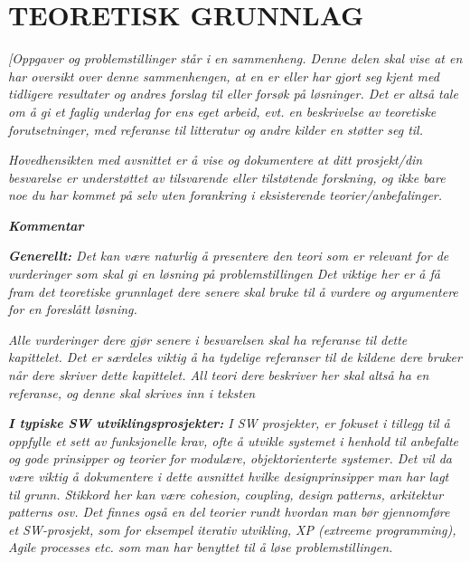 \documentclass[../main.tex]{subfiles}
\begin{document}
\section{TEORETISK GRUNNLAG}

\bigskip

{\itshape\color{blue}
[Oppgaver og problemstillinger st{\aa}r i en sammenheng. Denne delen skal vise at en har oversikt over denne
sammenhengen, at en er eller har gjort seg kjent med tidligere resultater og andres forslag til eller fors{\o}k p{\aa}
l{\o}sninger. Det er alts{\aa} tale om {\aa} gi et faglig underlag for ens eget arbeid, evt. en beskrivelse av
teoretiske forutsetninger, med referanse til litteratur og andre kilder en st{\o}tter seg til.}

{\itshape\color{blue}
Hovedhensikten med avsnittet er {\aa} vise og dokumentere at ditt prosjekt/din besvarelse er underst{\o}ttet av
tilsvarende eller tilst{\o}tende forskning, og ikke bare noe du har kommet p{\aa} selv uten forankring i eksisterende
teorier/anbefalinger.}

{\bfseries\itshape\color{blue}
Kommentar }

{\itshape\color{blue}
\textbf{Generellt:} Det kan v{\ae}re naturlig {\aa} presentere den teori som er relevant for de vurderinger som skal gi
en l{\o}sning p{\aa} problemstillingen Det viktige her er {\aa} f{\aa} fram det teoretiske grunnlaget dere senere skal
bruke til {\aa} vurdere og argumentere for en foresl{\aa}tt l{\o}sning. }

{\itshape\color{blue}
Alle vurderinger dere gj{\o}r senere i besvarelsen skal ha referanse til dette kapittelet. Det er s{\ae}rdeles viktig
{\aa} ha tydelige referanser til de kildene dere bruker n{\aa}r dere skriver dette kapittelet. All teori dere beskriver
her skal alts{\aa} ha en referanse, og denne skal skrives inn i teksten}

{\itshape\color{blue}
\textbf{I typiske SW utviklingsprosjekter:} I SW prosjekter, er fokuset i tillegg til {\aa} oppfylle et sett av
funksjonelle krav, ofte {\aa} utvikle systemet i henhold til anbefalte og gode prinsipper og teorier for modul{\ae}re,
objektorienterte systemer. Det vil da v{\ae}re viktig {\aa} dokumentere i dette avsnittet hvilke designprinsipper man
har lagt til grunn. Stikkord her kan v{\ae}re cohesion, coupling, design patterns, arkitektur patterns osv. Det finnes
ogs{\aa} en del teorier rundt hvordan man b{\o}r gjennomf{\o}re et SW-prosjekt, som for eksempel iterativ utvikling, XP
(extreeme programming), Agile processes etc. som man har benyttet til {\aa} l{\o}se problemstillingen.}
\end{document}
